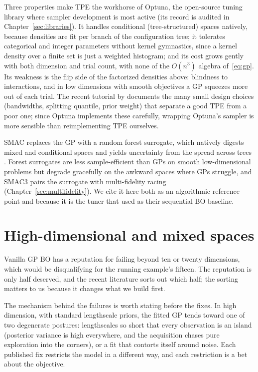 Three properties make TPE the workhorse of Optuna, the open-source
tuning library where sampler development is most active (its record is
audited in Chapter~\ref{sec:libraries}). It
handles conditional (tree-structured) spaces natively, because densities
are fit per branch of the configuration tree; it tolerates categorical
and integer parameters without kernel gymnastics, since a kernel density
over a finite set is just a weighted histogram; and its cost grows gently
with both dimension and trial count, with none of the $O(n^3)$ algebra
of~\eqref{eq:gp}. Its weakness is the flip side of the factorized
densities above: blindness to interactions, and in low dimensions with
smooth objectives a GP squeezes more out of each trial. The recent
tutorial by \citet{watanabe2023tpe} documents the many small design
choices (bandwidths, splitting quantile, prior weight) that separate a
good TPE from a poor one; since Optuna implements these carefully,
wrapping Optuna's sampler is more sensible than reimplementing TPE
ourselves.

SMAC replaces the GP with a random forest surrogate, which natively
digests mixed and conditional spaces and yields uncertainty from the
spread across trees \citep{lindauer2022smac3}. Forest surrogates are less
sample-efficient than GPs on smooth low-dimensional problems but degrade
gracefully on the awkward spaces where GPs struggle, and SMAC3 pairs the
surrogate with multi-fidelity racing (Chapter~\ref{sec:multifidelity}).
We cite it here both as an algorithmic reference point and because it is
the tuner that \citet{wan2022bgpbt} used as their sequential BO baseline.

\section{High-dimensional and mixed spaces}
\label{sec:highdim}

Vanilla GP BO has a reputation for failing beyond ten or twenty
dimensions, which would be disqualifying for the running example's
fifteen. The reputation is only half deserved, and the recent literature
sorts out which half; the sorting matters to us because it changes what
we build first.

The mechanism behind the failures is worth stating before the fixes. In
high dimension, with standard lengthscale priors, the fitted GP tends
toward one of two degenerate postures: lengthscales so short that every
observation is an island (posterior variance is high everywhere, and the
acquisition chases pure exploration into the corners), or a fit that
contorts itself around noise. Each published fix restricts the model in a
different way, and each restriction is a bet about the objective.

